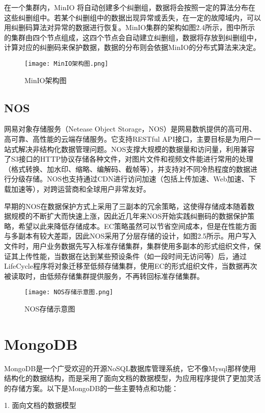 在一个集群内，MinIO 将自动创建多个纠删组，数据将会按照一定的算法分布在这些纠删组中。若某个纠删组中的数据出现异常或丢失，在一定的故障域内，可以用纠删码算法对异常的数据进行恢复。MinIO集群的架构如图2.4所示，图中所示的集群由四个节点组成，这四个节点会自动建立纠删组，数据将存放到纠删组中，计算对应的纠删码来保护数据，数据的分布则会依据MinIO的分布式算法来决定。

\begin{figure}
    \centering
    \texttt{[image: MinIO架构图.png]}
    \caption{MinIO架构图}
\end{figure}

\subsection{NOS}%
网易对象存储服务（Netease Object Storage，NOS）是网易数帆提供的高可用、高可靠、高性能的云端存储服务。它支持RESTful API接口，主要目标是为用户一站式解决非结构化数据管理问题。NOS支撑大规模的数据量和访问量，利用兼容了S3接口的HTTP协议存储各种文件，对图片文件和视频文件能进行常用的处理（格式转换、加水印、缩略、编解码、截帧等），并支持对不同冷热程度的数据进行分级存储。NOS也支持通过CDN进行访问加速（包括上传加速、Web加速、下载加速等），对跨运营商和全球用户非常友好。

早期的NOS在数据保护方式上采用了三副本的冗余策略，这使得存储成本随着数据规模的不断扩大而快速上涨，因此近几年来NOS开始实践纠删码的数据保护策略，希望以此来降低存储成本。EC策略虽然可以节省空间成本，但是在性能方面与多副本有较大差距，因此NOS采用了分层存储的设计，如图2.5所示。用户写入文件时，用户业务数据先写入标准存储集群，集群使用多副本的形式组织文件，保证其上传性能，当数据在达到某些预设条件（如一段时间无访问等）后，通过LifeCycle程序将对象迁移至低频存储集群，使用EC的形式组织文件，当数据再次被读取时，由低频存储集群提供服务，不再转回标准存储集群。

\begin{figure}
    \centering
    \texttt{[image: NOS存储示意图.png]}
    \caption{NOS存储示意图}
\end{figure}

\section{MongoDB}%
MongoDB是一个广受欢迎的开源NoSQL数据库管理系统，它不像Mysql那样使用结构化的数据结构，而是采用了面向文档的数据模型，为应用程序提供了更加灵活的存储方案。以下是MongoDB的一些主要特点和功能：

1. 面向文档的数据模型

